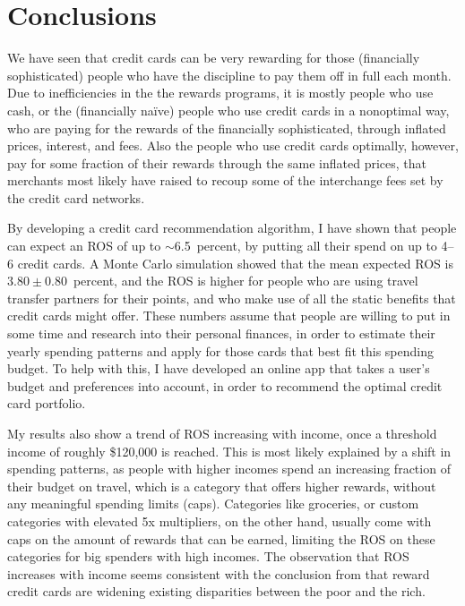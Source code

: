 \section{Conclusions} \label{sec:Conclusions}

We have seen that credit cards can be very rewarding for those (financially sophisticated) people who have the discipline to pay them off in full each month.
Due to inefficiencies in the the rewards programs, it is mostly people who use cash, or the (financially na\"{i}ve) people who use credit cards in a nonoptimal way, who are paying for the rewards of the financially sophisticated, through inflated prices, interest, and fees. 
Also the people who use credit cards optimally, however, pay for some fraction of their rewards through the same inflated prices, that merchants most likely have raised to recoup some of the interchange fees set by the credit card networks.

By developing a credit card recommendation algorithm, I have shown that people can expect an ROS of up to $\sim$6.5~percent, by putting all their spend on up to 4--6 credit cards.
A Monte Carlo simulation showed that the mean expected ROS is $3.80\pm0.80$~percent, and 
the ROS is higher for people who are using travel transfer partners for their points, and who make use of all the static benefits that credit cards might offer.
These numbers assume that people are willing to put in some time and research into their personal finances, in order to estimate their yearly spending patterns and apply for those cards that best fit this spending budget. 
To help with this, I have developed an online app that takes a user's budget and preferences into account, in order to recommend the optimal credit card portfolio.

My results also show a trend of ROS increasing with income, once a threshold income of roughly \$120,000 is reached. 
This is most likely explained by a shift in spending patterns, as people with higher incomes spend an increasing fraction of their budget on travel, which is a category that offers higher rewards, without any meaningful spending limits (caps). 
Categories like groceries, or custom categories with elevated 5x multipliers, on the other hand, usually come with caps on the amount of rewards that can be earned, limiting the ROS on these categories for big spenders with high incomes.
The observation that ROS increases with income seems consistent with the conclusion from \cite{agaretal:2023} that reward credit cards are widening existing disparities between the poor and the rich.

